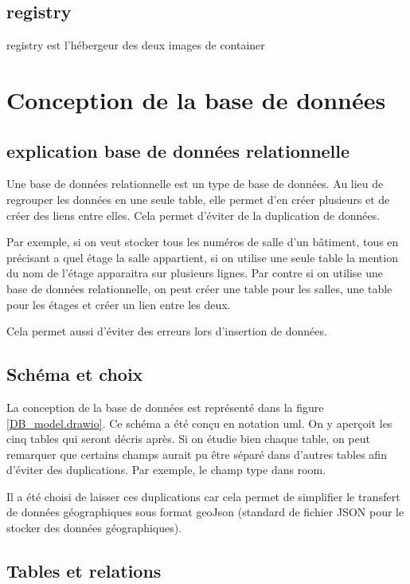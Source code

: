 \documentclass[
    iai, %
    il, %
]{heig-tb}
\begin{document}
\subsection{\gls{registry}}
\gls{registry} est l'hébergeur des deux images de container


\section{Conception de la base de données}

\subsection{explication base de données relationnelle}
Une base de données relationnelle est un type de base de données.
Au lieu de regrouper les données en une seule table,
elle permet d'en créer plusieurs et de créer des liens entre elles.
Cela permet d'éviter de la duplication de données.

Par exemple, si on veut stocker tous les numéros de salle d'un bâtiment, tous en précisant a quel étage la salle appartient,
si on utilise une seule table la mention du nom de l'étage apparaitra sur plusieurs lignes.
Par contre si on utilise une base de données relationnelle, on peut créer une table pour les salles,
une table pour les étages et créer un lien entre les deux.

Cela permet aussi d'éviter des erreurs lors d'insertion de données.

\subsection{Schéma et choix}


La conception de la base de données est représenté dans la figure \ref{DB_model.drawio}.
Ce schéma a été conçu en notation \gls{uml}. On y aperçoit les cinq tables qui seront décris après.
Si on étudie bien chaque table, on peut remarquer que certains champs aurait pu être séparé dans d'autres tables afin d'éviter des duplications. 
Par exemple, le champ type dans room.

Il a été choisi de laisser ces duplications
car cela permet de simplifier le transfert de données géographiques sous format geoJson
(standard de fichier JSON pour le stocker des données géographiques).

\subsection{Tables et  relations}
\end{document}
